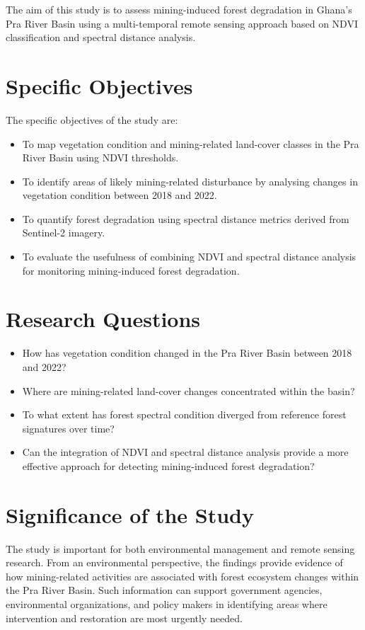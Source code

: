\documentclass[a4paper,12pt]{report}
\begin{document}
The aim of this study is to assess mining-induced forest degradation in Ghana's Pra River Basin using a multi-temporal remote sensing approach based on NDVI classification and spectral distance analysis.

\section{Specific Objectives}

The specific objectives of the study are:

\begin{itemize}
\item To map vegetation condition and mining-related land-cover classes in the Pra River Basin using NDVI thresholds.
\item To identify areas of likely mining-related disturbance by analysing changes in vegetation condition between 2018 and 2022.
\item To quantify forest degradation using spectral distance metrics derived from Sentinel-2 imagery.
\item To evaluate the usefulness of combining NDVI and spectral distance analysis for monitoring mining-induced forest degradation.
\end{itemize}

\section{Research Questions}

\begin{itemize}
\item How has vegetation condition changed in the Pra River Basin between 2018 and 2022?
\item Where are mining-related land-cover changes concentrated within the basin?
\item To what extent has forest spectral condition diverged from reference forest signatures over time?
\item Can the integration of NDVI and spectral distance analysis provide a more effective approach for detecting mining-induced forest degradation?
\end{itemize}


\section{Significance of the Study}

The study is important for both environmental management and remote sensing research. From an environmental perspective, the findings provide evidence of how mining-related activities are associated with forest ecosystem changes within the Pra River Basin. Such information can support government agencies, environmental organizations, and policy makers in identifying areas where intervention and restoration are most urgently needed.
\end{document}
